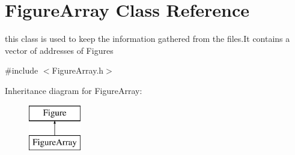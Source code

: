 \hypertarget{class_figure_array}{}\section{Figure\+Array Class Reference}
\label{class_figure_array}


this class is used to keep the information gathered from the files.\+It contains a vector of addresses of Figures  




{\ttfamily \#include $<$Figure\+Array.\+h$>$}

Inheritance diagram for Figure\+Array\+:\begin{figure}[H]
\begin{center}
\leavevmode
\includegraphics[height=2.000000cm]{class_figure_array}
\end{center}
\end{figure}
